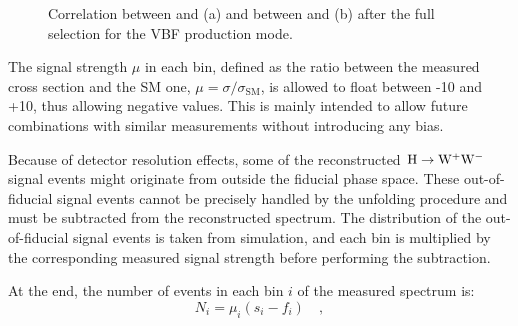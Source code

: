 \begin{figure}[htb]
\centering
{}
\caption{Correlation between \pth and \mll (a) and between \pth and \mt (b) after the full selection for the VBF production mode.\label{fig:correlation_vbf}}
\end{figure}

The signal strength $\mu$ in each bin, defined as the ratio between the measured cross section and the SM one, $\mu = \sigma/\sigma_\mathrm{SM}$, is allowed to float between -10 and +10, thus allowing negative values. This is mainly intended to allow future combinations with similar measurements without introducing any bias.

Because of detector resolution effects, some of the reconstructed ${\mathrm{H}\to\mathrm{W^+W^-}}$ signal events might originate from outside the fiducial phase space.  
These out-of-fiducial signal events cannot be precisely handled by the unfolding procedure and must be subtracted from the reconstructed spectrum. The \pth distribution of the out-of-fiducial signal events is taken from simulation, and each bin is multiplied by the corresponding measured signal strength before performing the subtraction. 

At the end, the number of events in each bin $i$ of the measured spectrum is:
\begin{equation}\label{eq:sig_yield}
N_i = \mu_i (s_i -f_i) \quad ,
\end{equation}

